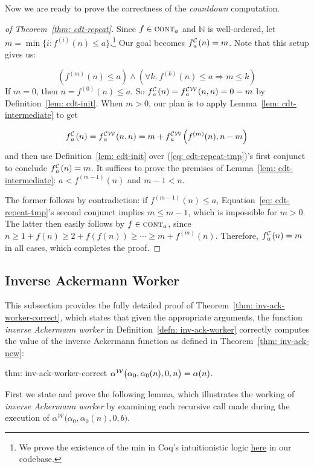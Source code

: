 Now we are ready to prove the correctness of the \emph{countdown} computation. \begin{proof}[of Theorem~\ref{thm: cdt-repeat}]
	Since $f\in \text{\scshape{cont}}_{a}$ and $\mathbb{N}$ is well-ordered,
	\linebreak let $m = \min\big\{i : f^{(i)}(n)\le a\big\}$.\footnote{We prove the existence
		of the min in Coq’s intuitionistic logic \href{https://github.com/inv-ack/inv-ack/blob/6099297c6ab0e16d14b037fb5ed600c4d22818f6/countdown.v\#L125-L150}{here} in our codebase.} Our goal becomes
	$\cdt{f}{a}(n) = m$. Note that this setup gives us:
	
	\begin{equation} \label{eq: cdt-repeat-tmp}
	\left(f^{(m)}(n) \le a\right) \wedge
	\left(\forall k.~f^{(k)}(n)\le a \Rightarrow m \le k\right)
	\end{equation}	
	If $m = 0$, then $n = f^{(0)}(n)\le a$. So $\cdt{f}{a}(n) = \cdw{f}{a}(n, n) = 0 = m$ by Definition~\ref{lem: cdt-init}.
	When $m > 0$, our plan is to apply Lemma~\ref{lem: cdt-intermediate} to get
	
	\begin{equation*}
	\cdt{f}{a}(n) = \cdw{f}{a}(n, n) = m + \cdw{f}{a}\left(f^{(m)}(n), n-m\right)
	\end{equation*}
	and then use Definition~\ref{lem: cdt-init} over (\ref{eq: cdt-repeat-tmp})'s first conjunct to conclude $\cdt{f}{a}(n) = m$. It suffices to prove the premises of Lemma~\ref{lem: cdt-intermediate}: $a < f^{(m-1)}(n)$ and $m-1 < n$.
	
	The former follows by contradiction: if $f^{(m-1)}(n) \le a$, Equation~\ref{eq: cdt-repeat-tmp}'s second conjunct implies $m\le m-1$, which is impossible for $m > 0$. The latter then easily follows by $f\in \text{\scshape{cont}}_{a}$, since
	$n \ge 1 + f(n) \ge 2 + f(f(n)) \ge \cdots \ge m + f^{(m)}(n)$.
	\linebreak Therefore, $\cdt{f}{a}(n) = m$ in all cases, which completes the proof.
\end{proof}

\subsection{Inverse Ackermann Worker}
\label{apx:proof_correct_inv_ack_worker}
This subsection provides the fully detailed proof of Theorem~\ref{thm: inv-ack-worker-correct}, which states that given the appropriate arguments, the function \emph{inverse Ackermann worker} in Definition~\ref{defn: inv-ack-worker} correctly computes the value of the inverse Ackermann function as defined in 
Theorem~\ref{thm: inv-ack-new}:
\begin{usethmcounterof}{thm: inv-ack-worker-correct}
	$\alpha^{\mathcal{W}}\big(\alpha_0, \alpha_0(n), 0, n\big) = \alpha(n)$.
\end{usethmcounterof}
First we state and prove the following lemma, which illustrates the working of \emph{inverse Ackermann worker} by examining each recursive call made during the execution of $\alpha^{\mathcal{W}}\big(\alpha_0, \alpha_0(n), 0, b\big)$.

